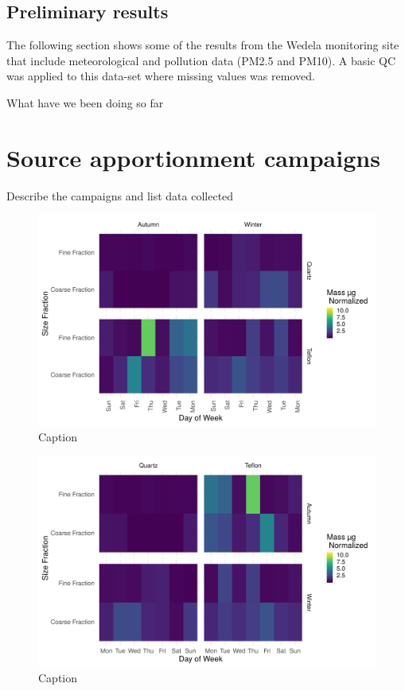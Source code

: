 \documentclass{nwureport}
\begin{document}
\section{Preliminary results}

The following section shows some of the results from the Wedela monitoring site that include meteorological
and pollution data (PM2.5 and PM10). A basic QC was applied to this data-set where missing values was removed.




What have we been doing so far


\chapter{Source apportionment campaigns}

Describe the campaigns and list data collected

\begin{figure}[!htb]
    \centering
    \includegraphics[width=\textwidth]{images/Density_DateSizeSeason_mass.png}
    \caption{Caption}
    \label{fig:summary}
\end{figure}

\begin{figure}[!htb]
    \centering
    \includegraphics[width=\textwidth]{images/Density_DaySizeSeason_mass.png}
    \caption{Caption}
    \label{fig:summary}
\end{figure}
\end{document}
